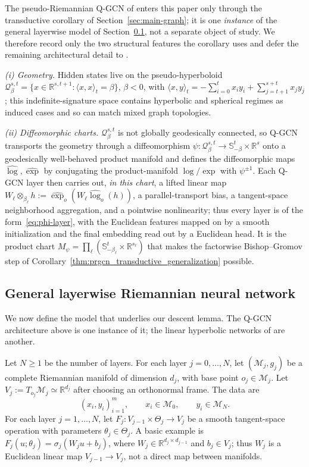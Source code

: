 \documentclass[letterpaper]{article}
\newcommand{\R}{\mathbb{R}}
\begin{document}
The pseudo-Riemannian Q-GCN of \cite{xiong2022pseudo} enters this paper only
through the transductive corollary of Section~\ref{sec:main-graph}; it is one
\emph{instance} of the general layerwise model of
Section~\ref{sec:prelim-riem-nn}, not a separate object of study. We therefore
record only the two structural features the corollary uses and defer the
remaining architectural detail to \cite{xiong2022pseudo}.

\emph{(i) Geometry.} Hidden states live on the pseudo-hyperboloid
$\mathcal Q_\beta^{s,t} = \{x\in\R^{s,t+1} : \langle x,x\rangle_t=\beta\}$,
$\beta<0$, with $\langle x,y\rangle_t = -\sum_{i=0}^t x_iy_i +
\sum_{j=t+1}^{s+t} x_jy_j$; this indefinite-signature space contains
hyperbolic and spherical regimes as induced cases and so can match mixed
graph topologies.

\emph{(ii) Diffeomorphic charts.} $\mathcal Q_\beta^{s,t}$ is not globally
geodesically connected, so Q-GCN transports the geometry through a
diffeomorphism $\psi:\mathcal Q_\beta^{s,t}\to\mathbb S^t_{-\beta}\times\R^s$
onto a geodesically well-behaved product manifold and defines the
diffeomorphic maps $\widehat{\log}, \widehat{\exp}$ by conjugating the
product-manifold $\log/\exp$ with $\psi^{\pm1}$. Each Q-GCN layer then carries
out, \emph{in this chart}, a lifted linear map
$W_\ell\otimes_{\beta_\ell}h := \widehat{\exp}_{o}(W_\ell\widehat{\log}_o(h))$,
a parallel-transport bias, a tangent-space neighborhood aggregation, and a
pointwise nonlinearity; thus every layer is of the
form~\eqref{eq:phi-layer}, with the Euclidean features mapped on by a smooth
initialization and the final embedding read out by a Euclidean head. It is
the product chart $M_\psi=\prod_\ell(\mathbb S^t_{-\beta_\ell}\times\R^{s_\ell})$
that makes the factorwise Bishop--Gromov step of
Corollary~\ref{thm:prgcn_transductive_generalization} possible.
\subsection{General layerwise Riemannian neural network}
\label{sec:prelim-riem-nn}

We now define the model that underlies our descent lemma. The Q-GCN
architecture above is one instance of it; the linear hyperbolic networks of
\cite{tifrea2018poincar} are another.

Let \(N\geq 1\) be the number of layers. For each layer \(j=0,\dots,N\),
let \((\mathcal M_j,g_j)\) be a complete Riemannian manifold of dimension
\(d_j\), with base point \(o_j\in \mathcal M_j\). Let
\(V_j:=T_{o_j}\mathcal M_j\simeq \mathbb R^{d_j}\) after choosing an
orthonormal frame. The data are
\[
(x_i,y_i)_{i=1}^m,
\qquad
x_i\in \mathcal M_0,
\qquad
y_i\in \mathcal M_N.
\]
For each layer \(j=1,\dots,N\), let \(F_j:V_{j-1}\times \Theta_j\to V_j\)
be a smooth tangent-space operation with parameters
\(\theta_j\in \Theta_j\). A basic example is \(F_j(u;\theta_j) =
\sigma_j(W_j u+b_j)\), where \(W_j\in \mathbb R^{d_j\times d_{j-1}}\) and
\(b_j\in V_j\); thus \(W_j\) is a Euclidean linear map \(V_{j-1}\to V_j\),
not a direct map between manifolds.
\end{document}
